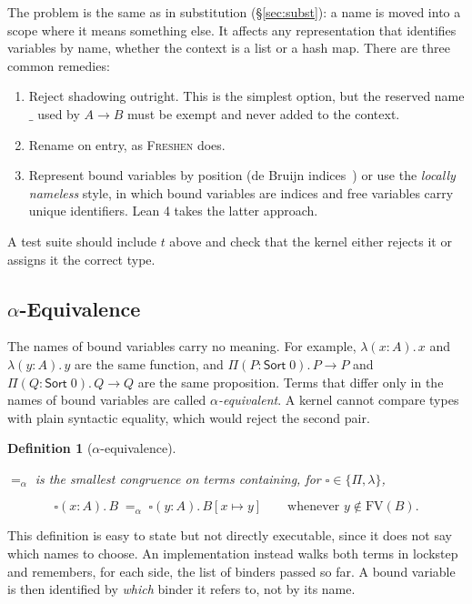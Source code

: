 \documentclass[acmsmall,screen,nonacm]{acmart}
\newtheorem{definition}{Definition}
\newcommand{\Sort}[1]{\mathsf{Sort}\;#1}
\newcommand{\tPi}[3]{\Pi(#1{:}#2).\,#3}
\newcommand{\tLam}[3]{\lambda(#1{:}#2).\,#3}
\newcommand{\subst}[3]{#1[#2 \mapsto #3]}
\newcommand{\FV}{\mathrm{FV}}
\newcommand{\alphaeq}{=_{\alpha}}
\begin{document}
The problem is the same as in substitution (\S\ref{sec:subst}): a name is moved into a scope where it means something else.
It affects any representation that identifies variables by name, whether the context is a list or a hash map.
There are three common remedies:
\begin{enumerate}
  \item Reject shadowing outright. This is the simplest option, but the reserved name $\_$ used by $A \to B$ must be exempt and never added to the context.
  \item Rename on entry, as \textsc{Freshen} does.
  \item Represent bound variables by position (de Bruijn indices~\cite{debruijn1972nameless}) or use the \emph{locally nameless} style, in which bound variables are indices and free variables carry unique identifiers. Lean 4 takes the latter approach.
\end{enumerate}
A test suite should include $t$ above and check that the kernel either rejects it or assigns it the correct type.

\subsection{$\alpha$-Equivalence}
\label{sec:alpha}

The names of bound variables carry no meaning. For example, $\tLam{x}{A}{x}$ and $\tLam{y}{A}{y}$ are the same function, and
$\tPi{P}{\Sort{0}}{P \to P}$ and $\tPi{Q}{\Sort{0}}{Q \to Q}$ are the same proposition. Terms that differ only in the names
of bound variables are called \emph{$\alpha$-equivalent}.
A kernel cannot compare types with plain syntactic equality, which would reject the second pair.

\begin{definition}[$\alpha$-equivalence]
\label{def:alpha}

$\alphaeq$ is the smallest congruence on terms containing, for $\square \in \{\Pi, \lambda\}$,

\[
\square(x{:}A).\,B \;\alphaeq\; \square(y{:}A).\,\subst{B}{x}{y}
\qquad \text{whenever } y \notin \FV(B).
\]

\end{definition}

This definition is easy to state but not directly executable, since it does not say which names to choose. An implementation
instead walks both terms in lockstep and remembers, for each side, the list of binders passed so far. A bound variable is
then identified by \emph{which} binder it refers to, not by its name.
\end{document}
